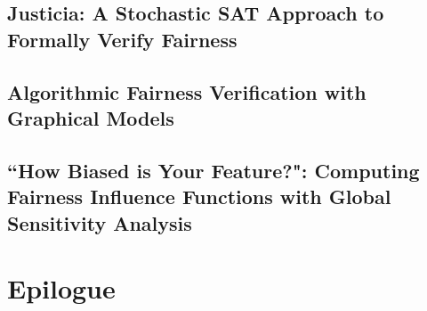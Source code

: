 \documentclass{report}
\makeatletter
\newcommand\backmatter{%
	\if@openright
	\cleardoublepage
	\else
	\clearpage
	\fi
}
\makeatother
\begin{document}
%	
		

			\chapter{Justicia: A Stochastic SAT Approach to Formally Verify Fairness}
%				
				
%				
				
				
				
				
%				
%				
			\chapter{Algorithmic Fairness Verification with Graphical Models}
%				
				
%				
				
				
				
				
				
%				
%				
			\chapter{``How Biased is Your Feature?": Computing Fairness Influence Functions with Global Sensitivity Analysis}				
%				
				
%				
				
				
				
					
			
		\part{Epilogue}
	\backmatter				 
	
%	
	
		
	
\end{document}
